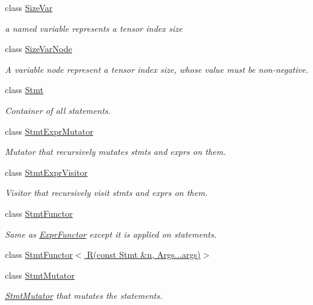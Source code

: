 \begin{DoxyCompactItemize}
class \hyperlink{classtvm_1_1tir_1_1SizeVar}{Size\+Var}
\begin{DoxyCompactList}\small\item\em a named variable represents a tensor index size \end{DoxyCompactList}\item 
class \hyperlink{classtvm_1_1tir_1_1SizeVarNode}{Size\+Var\+Node}
\begin{DoxyCompactList}\small\item\em A variable node represent a tensor index size, whose value must be non-\/negative. \end{DoxyCompactList}\item 
class \hyperlink{classtvm_1_1tir_1_1Stmt}{Stmt}
\begin{DoxyCompactList}\small\item\em Container of all statements. \end{DoxyCompactList}\item 
class \hyperlink{classtvm_1_1tir_1_1StmtExprMutator}{Stmt\+Expr\+Mutator}
\begin{DoxyCompactList}\small\item\em Mutator that recursively mutates stmts and exprs on them. \end{DoxyCompactList}\item 
class \hyperlink{classtvm_1_1tir_1_1StmtExprVisitor}{Stmt\+Expr\+Visitor}
\begin{DoxyCompactList}\small\item\em Visitor that recursively visit stmts and exprs on them. \end{DoxyCompactList}\item 
class \hyperlink{classtvm_1_1tir_1_1StmtFunctor}{Stmt\+Functor}
\begin{DoxyCompactList}\small\item\em Same as \hyperlink{classtvm_1_1tir_1_1ExprFunctor}{Expr\+Functor} except it is applied on statements. \end{DoxyCompactList}\item 
class \hyperlink{classtvm_1_1tir_1_1StmtFunctor_3_01R_07const_01Stmt_01_6n_00_01Args_8_8_8args_08_4}{Stmt\+Functor$<$ R(const Stmt \&n, Args...\+args)$>$}
\item 
class \hyperlink{classtvm_1_1tir_1_1StmtMutator}{Stmt\+Mutator}
\begin{DoxyCompactList}\small\item\em \hyperlink{classtvm_1_1tir_1_1StmtMutator}{Stmt\+Mutator} that mutates the statements. \end{DoxyCompactList}\item 

\end{DoxyCompactItemize}
